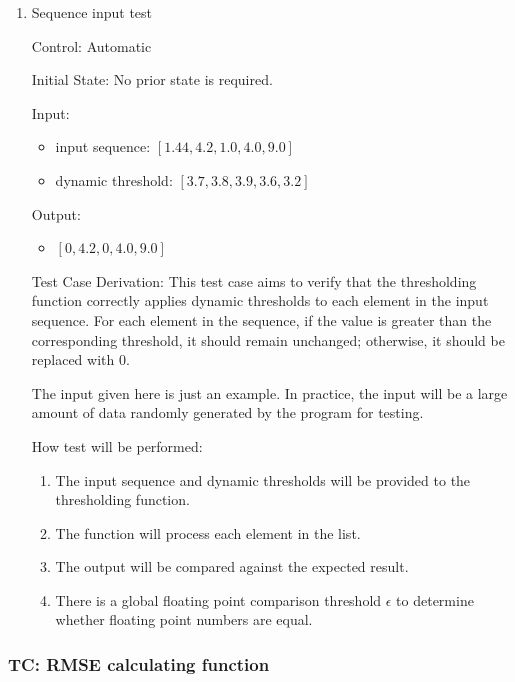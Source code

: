 \documentclass[12pt, titlepage]{article}
\begin{document}
\begin{enumerate}

  \item{Sequence input test\\}
  
  Control: Automatic
            
  Initial State: No prior state is required.
            
  Input:
  \begin{itemize}
    \item input sequence: $[1.44, 4.2, 1.0, 4.0, 9.0]$
    \item dynamic threshold: $[3.7, 3.8, 3.9, 3.6, 3.2]$
  \end{itemize}
  
  Output:
  \begin{itemize}
    \item $[0, 4.2, 0, 4.0, 9.0]$
  \end{itemize}
  
  Test Case Derivation: This test case aims to verify that the thresholding
  function correctly applies dynamic thresholds to each element in the input
  sequence.  For each element in the sequence, if the value is greater than the
  corresponding threshold, it should remain unchanged; otherwise, it should be
  replaced with $0$.

  The input given here is just an example.  In practice, the input will be a
  large amount of data randomly generated by the program for testing.
            
  How test will be performed: 
  \begin{enumerate}
    \item The input sequence and dynamic thresholds will be provided to the
    thresholding function.
    \item The function will process each element in the list.
    \item The output will be compared against the expected result.
    \item There is a global floating point comparison threshold $\epsilon$ to
    determine whether floating point numbers are equal.
  \end{enumerate}

\end{enumerate}

 \label{TC_RMSE}
\subsubsection{TC\thetestcasenum : RMSE calculating function}
\end{document}
